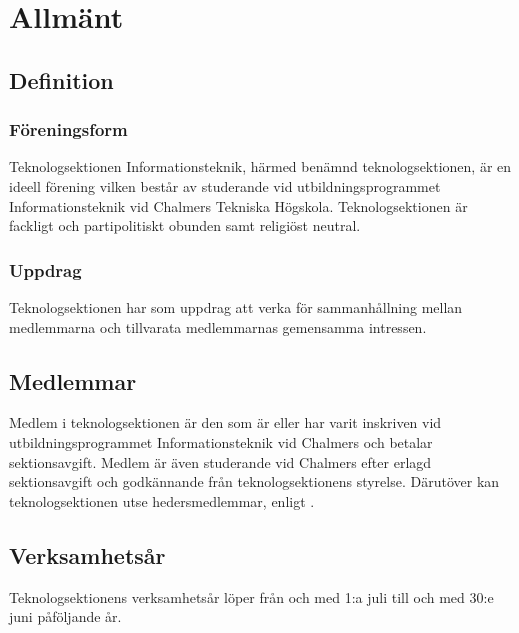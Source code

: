 \section{Allmänt}

\subsection{Definition}

\subsubsection{Föreningsform}
Teknologsektionen Informationsteknik, härmed benämnd teknologsektionen, är en ideell förening vilken består av studerande vid utbildningsprogrammet Informationsteknik vid Chalmers Tekniska Högskola. Teknologsektionen är fackligt och partipolitiskt obunden samt religiöst neutral.

\subsubsection{Uppdrag}
Teknologsektionen har som uppdrag att verka för sammanhållning mellan medlemmarna och tillvarata medlemmarnas gemensamma intressen.

\subsection{Medlemmar}

Medlem i teknologsektionen är den som är eller har varit inskriven vid utbildningsprogrammet Informationsteknik vid Chalmers och betalar sektionsavgift. Medlem är även studerande vid Chalmers efter erlagd sektionsavgift och godkännande från teknologsektionens styrelse. Därutöver kan teknologsektionen utse hedersmedlemmar, enligt .

\subsection{Verksamhetsår}
Teknologsektionens verksamhetsår löper från och med 1:a juli till och med 30:e juni påföljande år.
